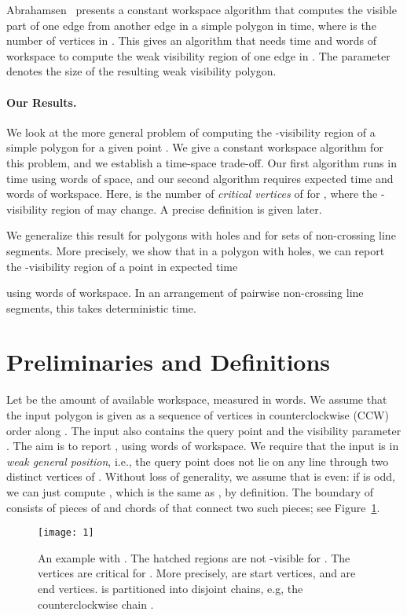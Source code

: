 \documentclass[11pt, a4paper]{article}
\begin{document}
Abrahamsen~\cite{Abrahamsen13} presents a constant workspace
algorithm that computes the visible part of one edge
from another edge in a simple polygon  in  time,
where  is the number of vertices in .
This gives an algorithm that needs  
time and  words of workspace to compute
the weak visibility region of one edge in .
The parameter  denotes the size of the resulting
weak visibility polygon.

\paragraph{Our Results.}
We look at the more general problem of 
computing the -visibility region of a simple 
polygon  for a given point .
We give a constant workspace algorithm for this
problem, and we establish a time-space trade-off. 
Our first algorithm runs in  time
using  words of space, and our second 
algorithm requires  
expected time and  words of workspace. 
Here,  is the number of 
\emph{critical vertices} of  for , where the 
-visibility region of  may change. A precise
definition is given later. 

We generalize this result for polygons with holes 
and for sets of non-crossing line segments.
More precisely, we show that in a polygon 
with  holes, we can report the -visibility
region of a point  in expected time 

using  words of workspace. In an
arrangement of  pairwise non-crossing line
segments, this takes  
deterministic time.

\section{Preliminaries and Definitions}

Let  be the amount of available workspace,
measured in words.
We assume that the input polygon  is given 
as a sequence of  vertices in counterclockwise (CCW) 
order along .
The input also contains the query point  and
the visibility parameter . The aim is to 
report , using  words 
of workspace. We require that the input is in \emph{weak 
general position}, i.e., the query point  does not lie on any 
line through two distinct vertices of . Without loss of generality, 
we assume that  is even: if  is odd, we 
can just compute , which is the same as
, by definition. The boundary  of 
 consists of pieces of  and chords 
of  that connect two such pieces; see Figure~\ref{fig:fig1}.

\begin{figure}
 \centering 
 \texttt{[image: 1]}
\caption{An example with . 
The hatched regions are not -visible for .
The vertices  are critical for .
More precisely,  are 
start vertices, and  
are end vertices.  is 
partitioned into  disjoint chains, e.g, 
the counterclockwise chain .}
\label{fig:fig1}
\end{figure}
\end{document}
